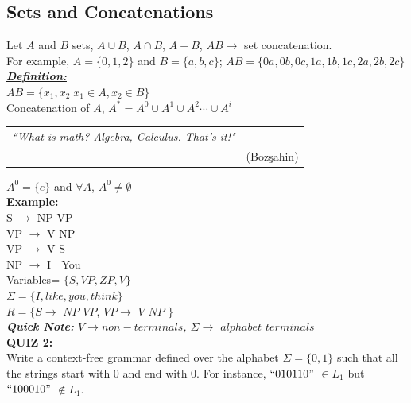 \documentclass[12pt,a4paper]{article}
\begin{document}
\subsection{Sets and Concatenations}
Let $A$ and $B$ sets, $A \cup B$, $A \cap B$, $A-B$, $AB \rightarrow$ set concatenation.\\
For example, $A = \lbrace 0,1,2 \rbrace$ and $B= \lbrace a,b,c \rbrace$; $AB= \lbrace 0a,0b,0c,1a,1b,1c,2a,2b,2c \rbrace$\\

\noindent \emph{\underline{\textbf{Definition:}}}\\
$AB = \lbrace x_{1}, x_{2} | x_{1} \in A, x_{2} \in B \rbrace$\\
Concatenation of $A$, $A^{\ast} = A^{0} \cup A^{1} \cup A^{2} \cdots \cup A^{i}$ \\

\begin{table}[H]
\centering
\begin{tabular}{cc}
\hline 
\emph{``What is math? Algebra, Calculus. That's it!"} & \\

 & (Bozşahin)\\
\hline 
\end{tabular} 
\end{table}

$A^{0}=\lbrace e \rbrace$ and $\forall A$, $A^{0} \neq \emptyset$\\

\noindent \underline{\textbf{Example:}}\\
S $\rightarrow$ NP VP\\
VP $\rightarrow$ V NP\\
VP $\rightarrow$ V S\\
NP $\rightarrow$ I $\mid$ You\\

\noindent Variables= $\lbrace S,VP,ZP,V \rbrace$\\
$\Sigma= \lbrace I,like,you,think \rbrace$\\
$R= \lbrace S \rightarrow$ $NP$ $VP$, $VP \rightarrow$ $V$ $NP$ $\rbrace$\\

\textit{\textbf{Quick Note:} $V \rightarrow non-terminals$, $\Sigma \rightarrow$ $alphabet$ $terminals$}\\
\clearpage
\noindent \textbf{\Large{QUIZ 2:}}\\
Write a context-free grammar defined over the alphabet $\Sigma = \lbrace 0,1 \rbrace$ such that all the strings start with 0 and end with 0. For instance, $``010110"$ $\in L_{1}$ but $``100010"$ $\notin L_{1}$.\\
\end{document}
